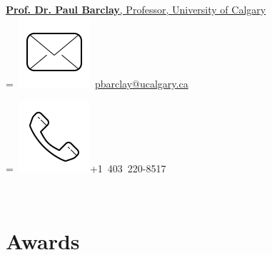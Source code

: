 \parbox{\wd0}{}\endgroup
\\
\sectionsep
\href{https://contacts.ucalgary.ca/info/phas/profiles/486-153949} {\textbf{Prof. Dr. Paul Barclay}, Professor, University of Calgary} 
\\
\begingroup
{}=\hbox{
\includegraphics[scale=0.1,trim={0 1cm 0cm 0cm}]{icons/main/mail.png}\hspace{0.1cm}  	\href{mailto:pbarclay@ucalgary.ca}{pbarclay@ucalgary.ca}
}
\parbox{\wd0}{}
\endgroup
\begingroup
{}=\hbox{
\includegraphics[scale=0.1,trim={0 1.25cm -0.4cm 0cm}]{icons/main/phone.png}\hspace{0.1cm}+1 403 220-8517
}
\parbox{\wd0}{}\endgroup
\\



\newpage
\section{Awards}

